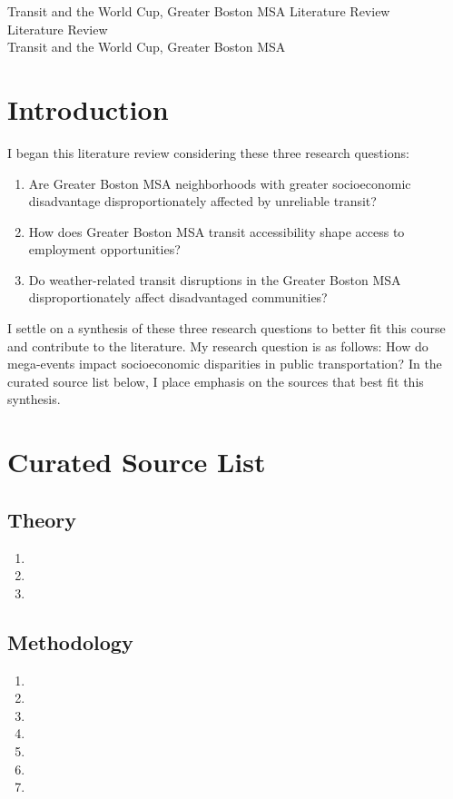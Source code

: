 \documentclass[12pt]{article}
\def\assignment{Literature Review}
\def\byline{Transit and the World Cup, Greater Boston MSA}
\begin{document}
\begingroup
\centering
\ifx\byline\empty
\LARGE\assignment\\
\else\LARGE\assignment\\\large\byline\\[1.5em]
\fi
\endgroup
\section{Introduction}
I began this literature review considering these three research questions:
\begin{enumerate}
    \item Are Greater Boston MSA neighborhoods with greater socioeconomic disadvantage disproportionately affected by unreliable transit?
    \item How does Greater Boston MSA transit accessibility shape access to employment opportunities?
    \item Do weather-related transit disruptions in the Greater Boston MSA disproportionately affect disadvantaged communities?
\end{enumerate}
I settle on a synthesis of these three research questions to better fit this course and contribute to the literature.
My research question is as follows:
How do mega-events impact socioeconomic disparities in public transportation?
In the curated source list below, I place emphasis on the sources that best fit this synthesis.
\section{Curated Source List}
\subsection{Theory}
\begin{enumerate}
    \item {}
    \item {}
    \item {}
\end{enumerate}
\subsection{Methodology}
\begin{enumerate}
    \item {}
    \item {}
    \item {}
    \item {}
    \item {}
    \item {}
    \item {}
\end{enumerate}
\end{document}
